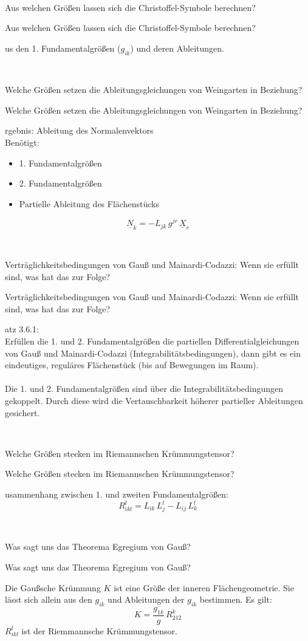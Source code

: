 \documentclass[DIV=1]{scrartcl}
\newcommand{\frage}[3][10]{
    \newpage
    \ 
    \vspace{#1 em}
    \begin{framed}
        #2
    \end{framed}
    \newpage
    \begin{framed}
        #2
    \end{framed}
    \vspace{2 em}
}
\begin{document}
\frage{Aus welchen Größen lassen sich die Christoffel-Symbole berechnen?}

Aus den 1. Fundamentalgrößen ($g_{ik}$) und deren Ableitungen.



\frage{Welche Größen setzen die Ableitungsgleichungen von Weingarten in Beziehung?}

Ergebnis: Ableitung des Normalenvektors\\
Benötigt:
\begin{itemize}
    \item 1. Fundamentalgrößen
    \item 2. Fundamentalgrößen
    \item Partielle Ableitung des Flächenstücks
\end{itemize}
\[
    \underline{N}_k = - L_{jk} \, g^{jr} \, \underline{X}_r
\]



\frage{Verträglichkeitsbedingungen von Gauß und Mainardi-Codazzi: Wenn sie erfüllt sind, was hat das zur Folge?}

Satz 3.6.1:\\
Erfüllen die 1. und 2. Fundamentalgrößen die partiellen Differentialgleichungen von Gauß und Mainardi-Codazzi (Integrabilitätsbedingungen), dann gibt es ein eindeutiges, reguläres Flächenstück (bis auf Bewegungen im Raum).\\
\\
Die 1. und 2. Fundamentalgrößen sind über die Integrabilitätsbedingungen gekoppelt. Durch diese wird die Vertauschbarkeit höherer partieller Ableitungen gesichert.



\frage{Welche Größen stecken im Riemannschen Krümmungstensor?}

Zusammenhang zwischen 1. und zweiten Fundamentalgrößen:
\[
    R_{ikl}^l = L_{ik} \, L_j^l - L_{ij} \, L_k^l
\]



\frage{Was sagt uns das Theorema Egregium von Gauß?}

\textit{Die Gaußsche Krümmung $K$ ist eine Größe der inneren Flächen\-geometrie. Sie lässt sich allein aus den $g_{ik}$ und Ableitungen der $g_{ik}$ bestimmen. Es gilt:}
\[
    K = \frac{g_{1k}}{g} \, R_{212}^k
\]
$R_{ikl}^l$ ist der Riemmannsche Krümmungstensor.
\end{document}
